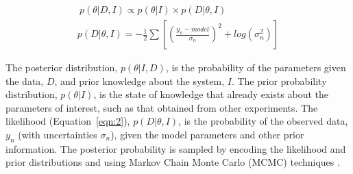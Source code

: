 \documentclass[12pt]{article}
\begin{document}
\begin{gather} 
\label{eqn:1}\ p(\theta | D, I) \propto p(\theta | I)\times p(D | \theta, I)\\
p(D | \theta, I) = -\frac{1}{2} \sum [(\frac{y_n - model} {\sigma_n})^2 + log(\sigma_n^2)]\label{eqn:2}
\end{gather}

The posterior distribution, $p(\theta | I, D)$, is the probability of the parameters given the data, $D$, and prior knowledge about the system, $I$. 
The prior probability distribution, $p(\theta | I)$, is the state of knowledge that already exists about the parameters of interest, such as that obtained from other experiments.
The likelihood (Equation~\ref{eqn:2}), $p(D | \theta, I)$, is the probability of the observed data, $y_n$ (with uncertainties $\sigma_n$), given the model parameters and other prior information.  The posterior probability is sampled by encoding the likelihood and prior distributions and using Markov Chain Monte Carlo (MCMC) techniques \cite{emcee}.
\end{document}
